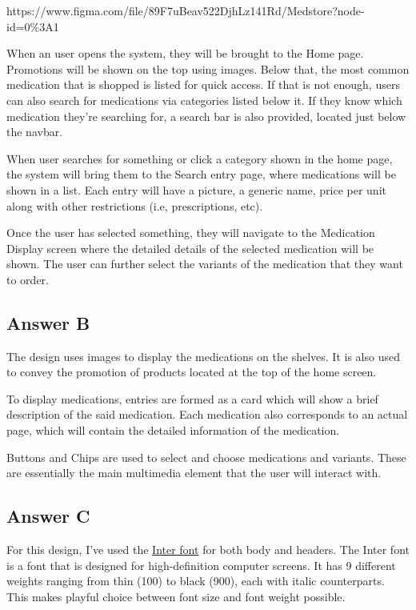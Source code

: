 \documentclass[
  11pt, %
]{assignment}
\begin{document}
\medskip

https://www.figma.com/file/89F7uBeav522DjhLz141Rd/Medstore?node-id=0\%3A1

\medskip

When an user opens the system, they will be brought to the Home page. Promotions will be shown on the top using images. Below that, the most common medication that is shopped is listed for quick access. If that is not enough, users can also search for medications via categories listed below it. If they know which medication they're searching for, a search bar is also provided, located just below the navbar.

When user searches for something or click a category shown in the home page, the system will bring them to the Search entry page, where medications will be shown in a list. Each entry will have a picture, a generic name, price per unit along with other restrictions (i.e, prescriptions, etc).

Once the user has selected something, they will navigate to the Medication Display screen where the detailed details of the selected medication will be shown. The user can further select the variants of the medication that they want to order.

\subsection*{Answer B}

The design uses images to display the medications on the shelves. It is also used to convey the promotion of products located at the top of the home screen.

\medskip

To display medications, entries are formed as a card which will show a brief description of the said medication. Each medication also corresponds to an actual page, which will contain the detailed information of the medication.

\medskip

Buttons and Chips are used to select and choose medications and variants. These are essentially the main multimedia element that the user will interact with.

\subsection*{Answer C}

For this design, I've used the \href{https://rsms.me/inter}{Inter font} for both body and headers. The Inter font is a font that is designed for high-definition computer screens. It has 9 different weights ranging from thin (100) to black (900), each with italic counterparts. This makes playful choice between font size and font weight possible.
\end{document}
